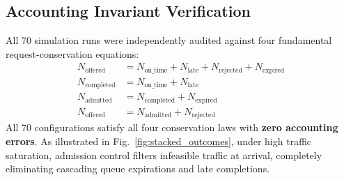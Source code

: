 \documentclass[conference]{IEEEtran}
\begin{document}
\begin{table}[t]
\centering
\caption{On-Time Completion Ratio (\%) Across All 70 Configurations ($N=100$ Offered Requests)}
\label{tab:results}
\end{table}

\subsection{Accounting Invariant Verification}
All 70 simulation runs were independently audited against four fundamental request-conservation equations:
\begin{align}
N_{\text{offered}} &= N_{\text{on\_time}} + N_{\text{late}} + N_{\text{rejected}} + N_{\text{expired}} \\
N_{\text{completed}} &= N_{\text{on\_time}} + N_{\text{late}} \\
N_{\text{admitted}} &= N_{\text{completed}} + N_{\text{expired}} \\
N_{\text{offered}} &= N_{\text{admitted}} + N_{\text{rejected}}
\end{align}
All 70 configurations satisfy all four conservation laws with \textbf{zero accounting errors}. As illustrated in Fig.~\ref{fig:stacked_outcomes}, under high traffic saturation, admission control filters infeasible traffic at arrival, completely eliminating cascading queue expirations and late completions.
\end{document}
